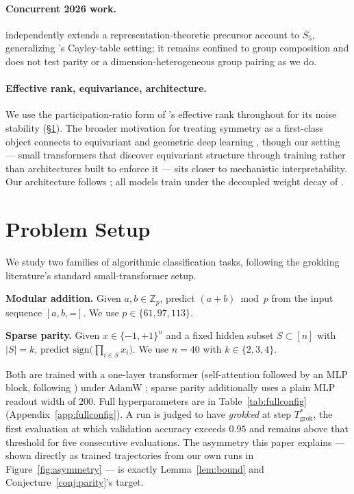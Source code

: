\documentclass{article}
\begin{document}
\paragraph{Concurrent 2026 work.} \citet{sivasankar2026circuit}
independently extends a representation-theoretic precursor account to
$S_5$, generalizing \citet{chughtai2023toy}'s Cayley-table setting; it
remains confined to group composition and does not test parity or a
dimension-heterogeneous group pairing as we do.

\paragraph{Effective rank, equivariance, architecture.} We use the
participation-ratio form of \citet{roy2007effective}'s effective rank
throughout for its noise stability (\S\ref{sec:setup}). The broader
motivation for treating symmetry as a first-class object connects to
equivariant and geometric deep learning
\citep{cohen2016group,bronstein2021geometric}, though our setting ---
small transformers that discover equivariant structure through training
rather than architectures built to enforce it --- sits closer to
mechanistic interpretability. Our architecture follows
\citet{vaswani2017attention}; all models train under the decoupled weight
decay of \citet{loshchilov2019decoupled}.

\FloatBarrier
\section{Problem Setup}
\label{sec:setup}

We study two families of algorithmic classification tasks, following the
grokking literature's standard small-transformer setup.

\textbf{Modular addition.} Given $a, b \in \mathbb{Z}_p$, predict
$(a+b) \bmod p$ from the input sequence $[a, b, \texttt{=}]$. We use
$p \in \{61, 97, 113\}$.

\textbf{Sparse parity.} Given $x \in \{-1,+1\}^n$ and a fixed hidden subset
$S \subset [n]$ with $|S|=k$, predict $\mathrm{sign}\big(\prod_{i\in S} x_i\big)$.
We use $n=40$ with $k \in \{2,3,4\}$.

Both are trained with a one-layer transformer (self-attention followed by an
MLP block, following \citealp{vaswani2017attention}) under AdamW
\citep{loshchilov2019decoupled}; sparse parity additionally uses a plain MLP
readout width of $200$. Full hyperparameters are in
Table~\ref{tab:fullconfig} (Appendix~\ref{app:fullconfig}).
A run is judged to have \emph{grokked} at step $T^*_{\mathrm{grok}}$, the
first evaluation at which validation accuracy exceeds $0.95$ and remains
above that threshold for five consecutive evaluations. The asymmetry this
paper explains --- shown directly as trained trajectories from our own
runs in Figure~\ref{fig:asymmetry} --- is exactly Lemma~\ref{lem:bound} and
Conjecture~\ref{conj:parity}'s target.
\end{document}
